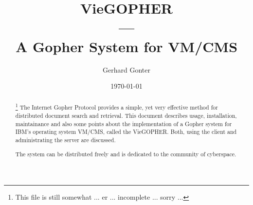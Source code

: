 
%
%
%
%
\pagestyle{headings}








\thispagestyle{empty}
\title{VieGOPHER\\---\\A Gopher System for VM/CMS}
\author{Gerhard Gonter}
\date{\today}
\maketitle

\begin{abstract}\footnote{This
file is still somewhat ... er ... incomplete ... sorry ...}
The Internet Gopher Protocol provides a simple, yet very effective
method for distributed document search and retrieval.  This document
describes usage, installation, maintainance and also some points 
about the implementation of a Gopher
system for IBM's operating system VM/CMS, called the VieGOPHER.
Both, using the client and administrating the server are discussed.

The system can be distributed freely and is dedicated to the community
of cyberspace.
\end{abstract}

\pagebreak[4]
\tableofcontents
\pagebreak[4]
\listoftables
\listoffigures
\pagebreak[4]

